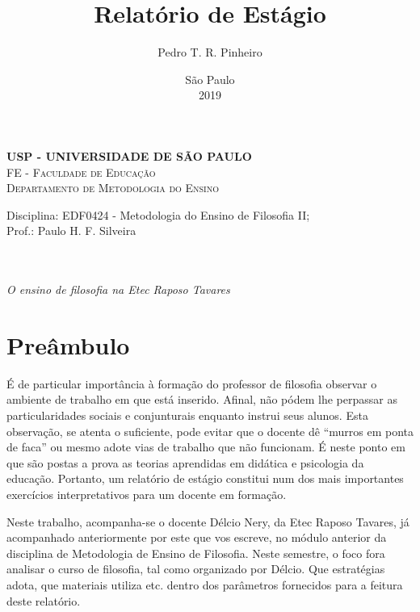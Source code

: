 \documentclass[12pt,a4paper]{article}
\author{Pedro T. R. Pinheiro}
\date{São Paulo\\2019}
\title{Relatório de Estágio}
\newcommand{\subtitulo}{O ensino de filosofia na Etec Raposo Tavares}
\newcommand{\disciplina}{EDF0424 - Metodologia do Ensino de Filosofia II}
\newcommand{\departamento}{Departamento de Metodologia do Ensino}
\newcommand{\unidade}{FE - Faculdade de Educação}
\newcommand{\prof}{Paulo H. F. Silveira}
\begin{document}
	\begin{center}
				\textbf{
				\LARGE USP - UNIVERSIDADE DE SÃO PAULO \\
			}
			\Large \textsc{\unidade} \\
			\large \textsc{\departamento}\\
			\vspace*{1cm}
				
			Disciplina: \disciplina; \\Prof.: \prof
			\vfill
			\begin{center}
				{\Large \textsc{\theauthor}} \\ 
				\vspace{1cm}
				\LARGE\textbf{\thetitle} \\
				\Large\emph{\subtitulo}
			\end{center}
			\vfill
			\large\thedate
			\vspace*{1cm}
			\thispagestyle{empty}			
	\end{center}

	\newpage

	\setlength{\parskip}{0.5cm}
	\setlength{\parindent}{1.1cm}
	\onehalfspacing
	
	\section{Preâmbulo}
	
    É de particular importância à formação do professor de filosofia observar 
    o ambiente de trabalho em que está inserido. Afinal, não pódem lhe 
    perpassar as particularidades sociais e conjunturais enquanto instrui seus 
    alunos. Esta observação, se atenta o suficiente, pode evitar que o docente 
    dê “murros em ponta de faca” ou mesmo adote vias de trabalho que não 
    funcionam. É neste ponto em que são postas a prova as teorias aprendidas 
    em didática e psicologia da educação. Portanto, um relatório de estágio 
    constitui num dos mais importantes exercícios interpretativos para um 
    docente em formação. 

    Neste trabalho, acompanha-se o docente Délcio Nery, da Etec Raposo Tavares, 
    já acompanhado anteriormente por este que vos escreve, no módulo anterior 
    da disciplina de Metodologia de Ensino de Filosofia. Neste semestre, o foco 
    fora analisar o curso de filosofia, tal como organizado por Délcio. Que 
    estratégias adota, que materiais utiliza etc. dentro dos parâmetros 
    fornecidos para a feitura deste relatório. 
	
\end{document}
